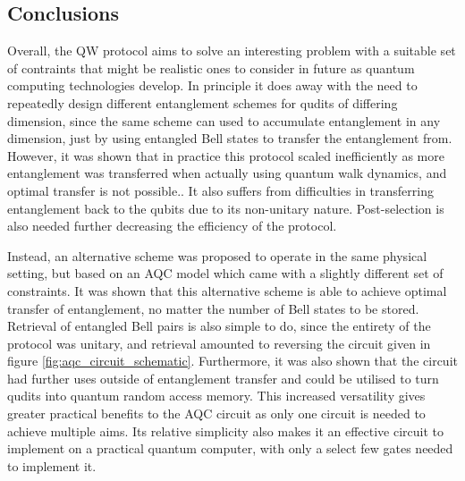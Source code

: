 \subsection{Conclusions}
\label{subsection:conclusions}
Overall, the QW protocol aims to solve an interesting problem with a suitable set of contraints that might be realistic ones to consider in future as quantum computing technologies develop.
In principle it does away with the need to repeatedly design different entanglement schemes for qudits of differing dimension, since the same scheme can used to accumulate entanglement in any dimension, just by using entangled Bell states to transfer the entanglement from.
However, it was shown that in practice this protocol scaled inefficiently as more entanglement was transferred when actually using quantum walk dynamics, and optimal transfer is not possible..
It also suffers from difficulties in transferring entanglement back to the qubits due to its non-unitary nature.
Post-selection is also needed further decreasing the efficiency of the protocol.\newline

Instead, an alternative scheme was proposed to operate in the same physical setting, but based on an AQC model which came with a slightly different set of constraints.
It was shown that this alternative scheme is able to achieve optimal transfer of entanglement, no matter the number of Bell states to be stored.
Retrieval of entangled Bell pairs is also simple to do, since the entirety of the protocol was unitary, and retrieval amounted to reversing the circuit given in figure \ref{fig:aqc_circuit_schematic}.
Furthermore, it was also shown that the circuit had further uses outside of entanglement transfer and could be utilised to turn qudits into quantum random access memory.
This increased versatility gives greater practical benefits to the AQC circuit as only one circuit is needed to achieve multiple aims.
Its relative simplicity also makes it an effective circuit to implement on a practical quantum computer, with only a select few gates needed to implement it.